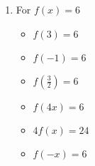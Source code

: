 \begin{enumerate}
\begin{multicols}{3}
\begin{itemize}
\item $f(3) = 2$
\item $f(-1) = 6$
\item $f\left(\frac{3}{2} \right) = -\frac{1}{4}$
\end{itemize}
\end{multicols}

\begin{multicols}{3}
\begin{itemize}
\item  $f(4x) = 16x^2-12x+2$
\item $4f(x) = 4x^2-12x+8$
\item $f(-x) = x^2+3x+2$
\end{itemize}
\end{multicols}

\begin{multicols}{3}
\begin{itemize}
\item  $f(x-4) = x^2-11x+30$
\item $f(x) - 4 = x^2-3x-2$
\item  $f\left(x^2\right) = x^4-3x^2+2$
\end{itemize}
\end{multicols}



\item For $f(x) = 6$ 

\begin{multicols}{3}
\begin{itemize}
\item $f(3) = 6$
\item $f(-1) =6$
\item $f\left(\frac{3}{2} \right) = 6$
\end{itemize}
\end{multicols}

\begin{multicols}{3}
\begin{itemize}
\item  $f(4x) = 6$
\item $4f(x) = 24$
\item $f(-x) = 6$
\end{itemize}
\end{multicols}

\begin{multicols}{3}
\begin{itemize}


\end{itemize}
\end{multicols}
\end{enumerate}
